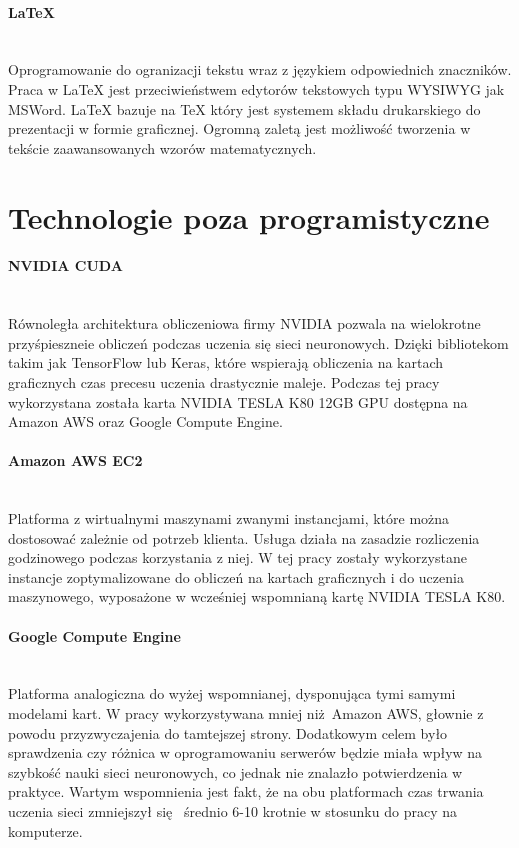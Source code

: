 \paragraph{LaTeX} \mbox{}\\
Oprogramowanie do ogranizacji tekstu wraz z językiem odpowiednich znaczników.
Praca w LaTeX jest przeciwieństwem edytorów tekstowych typu WYSIWYG jak MSWord.
LaTeX bazuje na TeX który jest systemem składu drukarskiego do prezentacji w
formie graficznej. Ogromną zaletą jest możliwość tworzenia w tekście zaawansowanych
wzorów matematycznych.

\section{Technologie poza programistyczne}

\paragraph{NVIDIA CUDA} \mbox{}\\
Równoległa architektura obliczeniowa firmy NVIDIA pozwala na wielokrotne
przyśpieszneie obliczeń podczas uczenia się sieci neuronowych. Dzięki bibliotekom
takim jak TensorFlow lub Keras, które wspierają obliczenia na kartach graficznych
czas precesu uczenia drastycznie maleje. Podczas tej pracy wykorzystana została
karta NVIDIA TESLA K80 12GB GPU dostępna na Amazon AWS oraz Google Compute Engine.

\paragraph{Amazon AWS EC2} \mbox{}\\
Platforma z wirtualnymi maszynami zwanymi instancjami, które można dostosować
zależnie od potrzeb klienta. Usługa działa na zasadzie rozliczenia godzinowego
podczas korzystania z niej. W tej pracy zostały wykorzystane instancje
zoptymalizowane do obliczeń na kartach graficznych i do uczenia maszynowego,
wyposażone w wcześniej wspomnianą kartę NVIDIA TESLA K80.

\paragraph{Google Compute Engine} \mbox{}\\
Platforma analogiczna do wyżej wspomnianej, dysponująca tymi samymi
modelami kart. W pracy wykorzystywana mniej niż Amazon AWS, głownie z powodu
przyzwyczajenia do tamtejszej strony. Dodatkowym celem było sprawdzenia czy
różnica w oprogramowaniu serwerów będzie miała wpływ na szybkość nauki sieci
neuronowych, co jednak nie znalazło potwierdzenia w praktyce. Wartym wspomnienia
jest fakt, że na obu platformach czas trwania uczenia sieci zmniejszył się 
średnio 6-10 krotnie w stosunku do pracy na komputerze.
